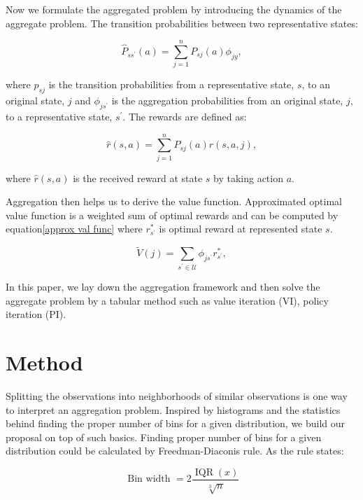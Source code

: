 \documentclass{article}
\begin{document}
    Now we formulate the aggregated problem by introducing the dynamics of the aggregate problem.
    The transition probabilities between
    two representative states:

    \begin{equation}
        \hat{P}_{s s^\prime}(a)=\sum_{j=1}^{n} P_{s j}(a) \phi_{j y},
    \end{equation}

    where $p_ {s j}$ is the transition probabilities from a representative state, $s$, to an original state, $j$
    and $\phi_{j s^\prime}$ is the aggregation probabilities from an original state, $j$, to a representative state,
    $s^\prime$.
    The rewards are defined as:

    \begin{equation}
        \hat{r}(s, a)=\sum_{j=1}^{n} P_{s j}(a) r(s, a, j),
    \end{equation}

    where $\hat{r}(s, a)$ is the received reward at state $s$ by taking action $a$.


    Aggregation then helps us to derive the value function.
    Approximated optimal value function is a weighted sum of optimal rewards and can be computed by
    equation\ref{approx val func} where $r_{s^\prime}^{\ast}$ is optimal reward at represented state $s$.

    \begin{equation}
        \label{approx val func}
        \tilde{V}(j)=\sum_{s^\prime \in \mathcal{U}} \phi_{j s^\prime} r_{s^\prime}^{\ast},
    \end{equation}

    In this paper, we lay down the aggregation framework and then solve the aggregate problem by a tabular method
    such as value iteration (VI), policy iteration (PI).


    \section{Method}
    Splitting the observations into neighborhoods of similar observations is one way to interpret an aggregation
    problem.
    Inspired by histograms and the statistics behind finding the proper number of bins for a given distribution, we
    build our proposal on top of such basics.
    Finding proper number of bins for a given distribution could be calculated by Freedman-Diaconis rule. As the rule
    states:

    \begin{equation}
        \text { Bin width }=2 \frac{\operatorname{IQR}(x)}{\sqrt[3]{n}}
    \end{equation}
\end{document}

